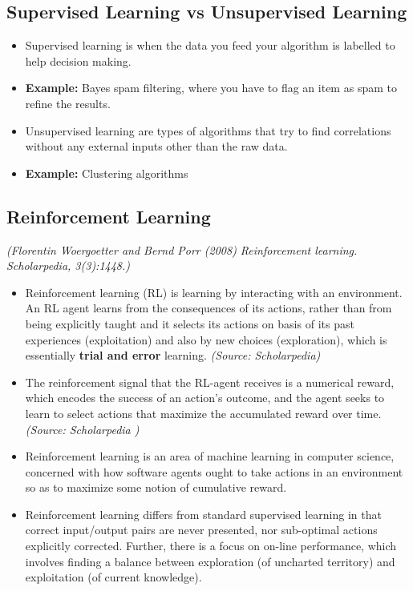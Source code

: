 \documentclass[11pt]{article} %
\begin{document}
\subsection{Supervised Learning vs Unsupervised Learning}
\begin{itemize}
\item Supervised learning is when the data you feed your algorithm is labelled to help decision making.
\item \textbf{Example:} Bayes spam filtering, where you have to flag an item as spam to refine the results.
\item Unsupervised learning are types of algorithms that try to find correlations without any external inputs other than the raw data.
\item \textbf{Example:} Clustering algorithms
\end{itemize}
\newpage

\subsection{Reinforcement Learning}
\emph{(Florentin Woergoetter and Bernd Porr (2008) Reinforcement learning. Scholarpedia, 3(3):1448.)}

\begin{itemize}
\item Reinforcement learning (RL) is learning by interacting with an environment. An RL agent learns from the consequences of its actions, rather than from being explicitly taught and it selects its actions on basis of its past experiences (exploitation) and also by new choices (exploration), which is essentially \textbf{trial and error} learning. \emph{(Source: Scholarpedia)}
\item The reinforcement signal that the RL-agent receives is a numerical reward, which encodes the success of an action's outcome, and the agent seeks to learn to select actions that maximize the accumulated reward over time. \emph{(Source: Scholarpedia )}

\item Reinforcement learning is an area of machine learning in computer science, concerned with how software agents ought to take actions in an environment so as to maximize some notion of cumulative reward. 
\item Reinforcement learning differs from standard supervised learning in that correct input/output pairs are never presented, nor sub-optimal actions explicitly corrected. Further, there is a focus on on-line performance, which involves finding a balance between exploration (of uncharted territory) and exploitation (of current knowledge). 
\end{itemize}
\end{document}
